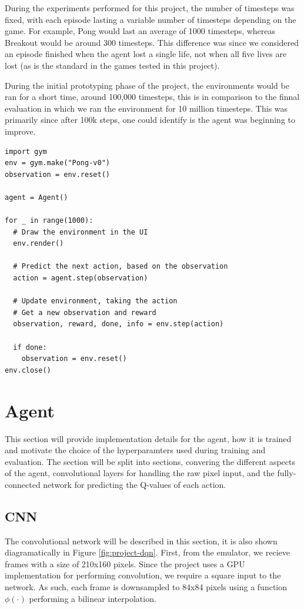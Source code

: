 During the experiments performed for this project, the number of timesteps was fixed, with each episode lasting a variable number of timesteps depending on the game. For example, Pong would last an average of 1000 timesteps, whereas Breakout would be around 300 timesteps. This difference was since we considered an episode finished when the agent lost a single life, not when all five lives are lost (as is the standard in the games tested in this project).

During the initial prototyping phase of the project, the environments would be ran for a short time, around 100,000 timesteps, this is in comparison to the finnal evaluation in which we ran the environment for 10 million timesteps. This was primarily since after 100k steps, one could identify is the agent was beginning to improve.

\begin{code}
  \label{code:basic-gym}
  \begin{verbatim}
import gym
env = gym.make("Pong-v0")
observation = env.reset()

agent = Agent()

for _ in range(1000):
  # Draw the environment in the UI
  env.render()

  # Predict the next action, based on the observation
  action = agent.step(observation)

  # Update environment, taking the action
  # Get a new observation and reward
  observation, reward, done, info = env.step(action)

  if done:
    observation = env.reset()
env.close()
\end{verbatim}
\end{code}

\section{Agent}
This section will provide implementation details for the agent, how it is trained and motivate the choice of the hyperparamters used during training and evaluation. The section will be split into sections, convering the different aspects of the agent, convolutional layers for handling the raw pixel input, and the fully-connected network for predicting the Q-values of each action.

\subsection{CNN}
The convolutional network will be described in this section, it is also shown diagramatically in Figure \ref{fig:project-dqn}. First, from the emulator, we recieve frames with a size of 210x160 pixels. Since the project uses a GPU implementation for performing convolution, we require a square input to the network. As such, each frame is downsampled to 84x84 pixels using a function $\phi(\cdot)$ performing a bilinear interpolation.

